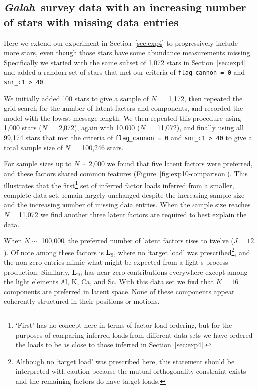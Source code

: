 \documentclass[twocolumn]{aastex62}
\newcommand{\project}[1]{\textsl{#1}}
\newcommand{\Galah}{\project{Galah}}
\newcommand{\factorloads}{\textbf{L}}
\begin{document}
\subsection{\Galah\ survey data with an increasing number of stars with missing data entries} \label{sec:exp10}
Here we extend our experiment in Section~\ref{sec:exp4} to progressively
include more stars, even though those stars have some abundance measurements
missing. 
Specifically we started with the same subset of 1,072 stars in Section~\ref{sec:exp4}
and added a random set of stars that met our criteria of \texttt{flag\_cannon = 0} and
\texttt{snr\_c1 > 40}. 


We initially added 100 stars to give a sample of $N =$ 1,172, then repeated
the grid search for the number of latent factors and components, and recorded
the model with the lowest message length. We then repeated this
procedure using 1,000 stars ($N =$ 2,072), again with 10,000 ($N =$ 11,072),
and finally using all 99,174 stars that met the criteria of \texttt{flag\_cannon = 0} and
\texttt{snr\_c1 > 40} to give a total sample size of $N =$ 100,246 stars.

For sample sizes up to $N \sim $2,000 we found that five latent factors were
preferred, and these factors shared common features (Figure~\ref{fig:exp10-comparison}).
This illustrates that the
first\footnote{`First' has no concept here in terms of factor load ordering, but
for the purposes of comparing inferred loads from different data sets we have ordered
the loads to be as close to those inferred in Section~\ref{sec:exp4}.} set of inferred factor
loads inferred from a smaller, complete data set, remain largely unchanged despite the increasing sample size and the increasing number of missing data entries.
When the sample size reaches $N = $11,072 we find another three latent factors are
required to best explain the data.


When $N \sim$ 100,000, the preferred number of latent factors rises to twelve ($J = 12$). Of note among these factors is $\factorloads_9$, where
no `target load' was prescribed\footnote{Although no `target load' was prescribed here, this statement should be interpreted with caution because the mutual orthogonality constraint exists and the remaining factors do have target loads.}, and the non-zero entries mimic what might be expected from a 
light s-process production. Similarly, $\factorloads_{10}$ has near zero contributions
everywhere except among the light elements Al, K, Ca, and Sc. 
With this data set we find that $K = 16$ components are preferred in latent space. None of these components appear coherently structured in their positions or motions.
\end{document}
